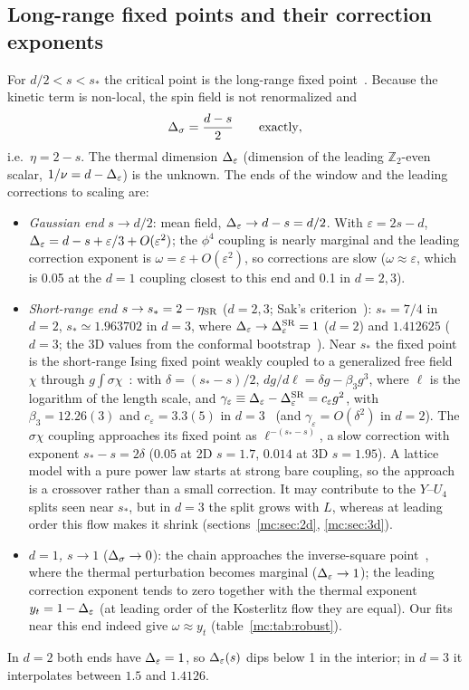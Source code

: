 \subsection{Long-range fixed points and their correction exponents}
For $d/2<s<s_*$ the critical point is the long-range fixed point~\cite{mc:Fisher:1972zz,mc:Sak:1973oqx,mc:Paulos:2015jfa}. Because the kinetic term is
non-local, the spin field is not renormalized and
\begin{equation}
 \Delta_\sigma=\frac{d-s}{2}\qquad\text{exactly},
\end{equation}
i.e.\ $\eta=2-s$. The thermal dimension $\Delta_\varepsilon$ (dimension of the leading $\mathbb Z_2$-even scalar, $1/\nu=d-\Delta_\varepsilon$) is the unknown. The ends of the
window and the leading corrections to scaling are:
\begin{itemize}
\item \emph{Gaussian end} $s\to d/2$: mean field, $\Delta_\varepsilon\to d-s=d/2$. With $\varepsilon=2s-d$, $\Delta_\varepsilon=d-s+\varepsilon/3+O(\varepsilon^2)$; the
 $\phi^4$ coupling is nearly marginal and the leading correction exponent is $\omega=\varepsilon+O(\varepsilon^2)$, so corrections are slow
 ($\omega\approx\varepsilon$, which is 0.05 at the $d=1$ coupling closest to this end and 0.1 in $d=2,3$).
\item \emph{Short-range end} $s\to s_*=2-\eta_{\rm SR}$ ($d=2,3$; Sak's criterion~\cite{mc:Sak:1973oqx}): $s_*=7/4$ in $d=2$, $s_*\simeq1.963702$
 in $d=3$, where $\Delta_\varepsilon\to\Delta_\varepsilon^{\rm SR}=1$ ($d=2$) and $1.412625$ ($d=3$; the 3D values from the conformal bootstrap~\cite{mc:Chang:2024whx}). Near $s_*$ the fixed point is the short-range Ising fixed point
 weakly coupled to a generalized free field $\chi$ through $g\int\sigma\chi$~\cite{mc:Behan:2017dwr,mc:Behan:2017emf}: with $\delta=(s_*-s)/2$,
 $dg/d\ell=\delta g-\beta_3g^3$, where $\ell$ is the logarithm of the length scale, and $\gamma_\varepsilon\equiv\Delta_\varepsilon-\Delta_\varepsilon^{\rm SR}=c_\varepsilon
 g^2$, with $\beta_3=12.26(3)$ and $c_\varepsilon=3.3(5)$ in $d=3$~\cite[eqs.~(2.24), (3.41)]{mc:Behan:2017emf} (and $\gamma_\varepsilon=O(\delta^2)$ in
 $d=2$). The $\sigma\chi$ coupling approaches its fixed point as $\ell^{-(s_*-s)}$, a slow correction with
 exponent $s_*-s=2\delta$ ($0.05$ at 2D $s=1.7$, $0.014$ at 3D $s=1.95$). A lattice model with a pure power law starts at strong bare
 coupling, so the approach is a crossover rather than a small correction. It may contribute to the $Y$--$U_4$ splits seen near $s_*$, but in
 $d=3$ the split grows with $L$, whereas at leading order this flow makes it shrink (sections~\ref{mc:sec:2d}, \ref{mc:sec:3d}).
\item \emph{$d=1$, $s\to1$} ($\Delta_\sigma\to0$): the chain approaches the inverse-square point~\cite{mc:Kosterlitz:1976zz,mc:Cardy:1981xx}, where the
 thermal perturbation becomes marginal ($\Delta_\varepsilon\to1$); the leading correction exponent tends to zero together with the thermal exponent
 $y_t=1-\Delta_\varepsilon$ (at leading order of the Kosterlitz flow they are equal). Our fits near this end indeed give $\omega\approx y_t$ (table~\ref{mc:tab:robust}).
\end{itemize}
In $d=2$ both ends have $\Delta_\varepsilon=1$, so $\Delta_\varepsilon(s)$ dips below 1 in the interior; in $d=3$ it interpolates between $1.5$ and $1.4126$.

